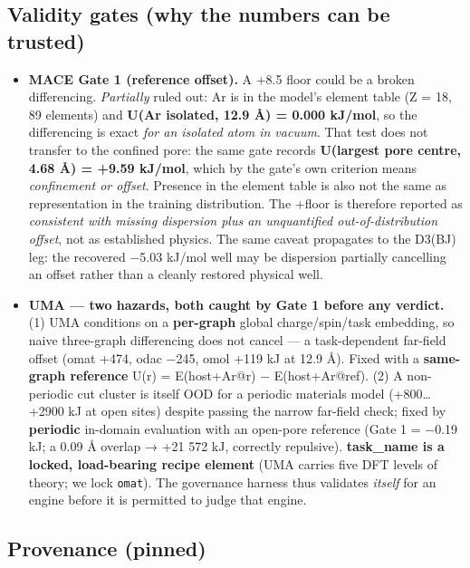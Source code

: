 \subsection{Validity gates (why the numbers can be
trusted)}\label{validity-gates-why-the-numbers-can-be-trusted}

\begin{itemize}
\tightlist
\item
  \textbf{MACE Gate 1 (reference offset).} A +8.5 floor could be a
  broken differencing. \emph{Partially} ruled out: Ar is in the model's
  element table (Z = 18, 89 elements) and
  \textbf{U(Ar isolated, 12.9 Å) = 0.000 kJ/mol}, so the differencing is
  exact \emph{for an isolated atom in vacuum}. That test does not
  transfer to the confined pore: the same gate records
  \textbf{U(largest pore centre, 4.68 Å) = +9.59 kJ/mol}, which by the
  gate's own criterion means \emph{confinement or offset}. Presence in
  the element table is also not the same as representation in the
  training distribution. The +floor is therefore reported as
  \emph{consistent with missing dispersion plus an unquantified
  out-of-distribution offset}, not as established physics. The same
  caveat propagates to the D3(BJ) leg: the recovered −5.03 kJ/mol well
  may be dispersion partially cancelling an offset rather than a
  cleanly restored physical well.
\item
  \textbf{UMA --- two hazards, both caught by Gate 1 before any
  verdict.} (1) UMA conditions on a \textbf{per-graph} global
  charge/spin/task embedding, so naive three-graph differencing does not
  cancel --- a task-dependent far-field offset (omat +474, odac −245,
  omol +119 kJ at 12.9 Å). Fixed with a \textbf{same-graph reference}
  U(r) = E(host+Ar@r) − E(host+Ar@ref). (2) A non-periodic cut cluster
  is itself OOD for a periodic materials model (+800\ldots+2900 kJ at
  open sites) despite passing the narrow far-field check; fixed by
  \textbf{periodic} in-domain evaluation with an open-pore reference
  (Gate 1 = −0.19 kJ; a 0.09 Å overlap → +21 572 kJ, correctly
  repulsive). \textbf{task\_name is a locked, load-bearing recipe
  element} (UMA carries five DFT levels of theory; we lock
  \texttt{omat}). The governance harness thus validates \emph{itself}
  for an engine before it is permitted to judge that engine.
\end{itemize}

\subsection{Provenance (pinned)}\label{provenance-pinned}

